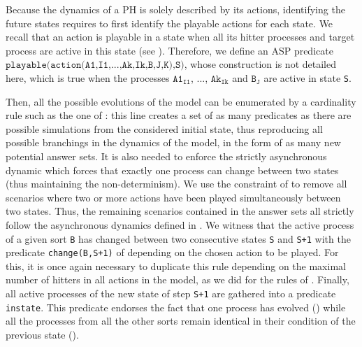 Because the dynamics of a PH is solely described by its actions, identifying the future states requires to first identify the playable actions for each state.
We recall that an action is playable in a state when all its hitter processes and target process are active in this state (see ).
Therefore, we define an ASP predicate $\texttt{playable(action(A1,I1,...,Ak,Ik,B,J,K),S)}$,
whose construction is not detailed here,
which is true when the processes $\texttt{A1}_{\texttt{I1}}$, ..., $\texttt{Ak}_{\texttt{Ik}}$ and $\texttt{B}_\texttt{J}$ are active in state \texttt{S}.

Then, all the possible evolutions of the model can be enumerated by a cardinality rule such as the one of :
this line creates a set of as many predicates as there are possible simulations from the considered initial state,
thus reproducing all possible branchings in the dynamics of the model, in the form of as many new potential answer sets.
It is also needed to enforce the strictly asynchronous dynamic
which forces that exactly one process can change between two states (thus maintaining the non-determinism).
We use the constraint of  to remove all scenarios where two or more actions have been played simultaneously between two states.
Thus, the remaining scenarios contained in the answer sets all strictly follow
the asynchronous dynamics defined in .
We witness that the active process of a given sort \texttt{B} has changed between two consecutive states \texttt{S} and \texttt{S+1} with the predicate \texttt{change(B,S+1)} of 
depending on the chosen action to be played.
For this, it is once again necessary to duplicate this rule depending on the maximal number of hitters in all actions in the model,
as we did for the rules of .
Finally, all active processes of the new state of step \texttt{S+1}
are gathered into a predicate \texttt{instate}.
This predicate endorses the fact that one process has evolved ()
while all the processes from all the other sorts
remain identical in their condition of the previous state ().

